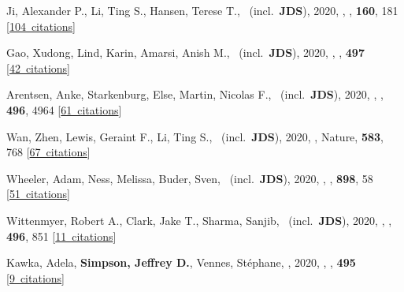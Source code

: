 \item[{\color{numcolor}\scriptsize50}] Ji, Alexander P., Li, Ting S., Hansen, Terese T., \etal\ (incl.\ \textbf{JDS}), 2020, , \aj, \textbf{160}, 181 [\href{https://ui.adsabs.harvard.edu/#abs/2020AJ....160..181J}{104~citations}]

\item[{\color{numcolor}\scriptsize49}] Gao, Xudong, Lind, Karin, Amarsi, Anish M., \etal\ (incl.\ \textbf{JDS}), 2020, , \mnras, \textbf{497} [\href{https://ui.adsabs.harvard.edu/#abs/2020MNRAS.497L..30G}{42~citations}]

\item[{\color{numcolor}\scriptsize48}] Arentsen, Anke, Starkenburg, Else, Martin, Nicolas F., \etal\ (incl.\ \textbf{JDS}), 2020, , \mnras, \textbf{496}, 4964 [\href{https://ui.adsabs.harvard.edu/#abs/2020MNRAS.496.4964A}{61~citations}]

\item[{\color{numcolor}\scriptsize47}] Wan, Zhen, Lewis, Geraint F., Li, Ting S., \etal\ (incl.\ \textbf{JDS}), 2020, , Nature, \textbf{583}, 768 [\href{https://ui.adsabs.harvard.edu/#abs/2020Natur.583..768W}{67~citations}]

\item[{\color{numcolor}\scriptsize46}] Wheeler, Adam, Ness, Melissa, Buder, Sven, \etal\ (incl.\ \textbf{JDS}), 2020, , \apj, \textbf{898}, 58 [\href{https://ui.adsabs.harvard.edu/#abs/2020ApJ...898...58W}{51~citations}]

\item[{\color{numcolor}\scriptsize45}] Wittenmyer, Robert A., Clark, Jake T., Sharma, Sanjib, \etal\ (incl.\ \textbf{JDS}), 2020, , \mnras, \textbf{496}, 851 [\href{https://ui.adsabs.harvard.edu/#abs/2020MNRAS.496..851W}{11~citations}]

\item[{\color{numcolor}\scriptsize44}] Kawka, Adela, \textbf{Simpson, Jeffrey D.}, Vennes, St{\'e}phane, \etal, 2020, , \mnras, \textbf{495} [\href{https://ui.adsabs.harvard.edu/#abs/2020MNRAS.495L.129K}{9~citations}]

